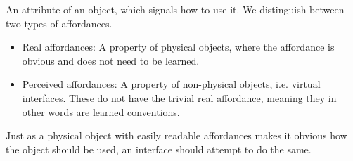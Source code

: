 \begin{definition}[Affordance] \label{def:affordance} 
  An attribute of an object, which signals how to use it. We distinguish between two types of affordances.
  \begin{itemize}
    \item Real affordances: A property of physical objects, where the affordance is obvious and does not need to be learned.
    \item Perceived affordances: A property of non-physical objects, i.e. virtual interfaces. These do not have the trivial real affordance, meaning they in other words are learned conventions.
    \end{itemize}
    Just as a physical object with easily readable affordances makes it obvious how the object should be used, an interface should attempt to do the same. \cite[p. 30]{rogers}
\end{definition}